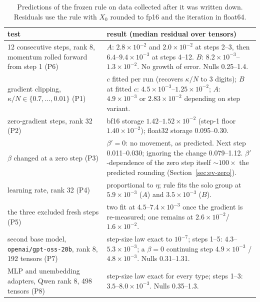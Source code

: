 \documentclass[11pt]{article}
\begin{document}
\begin{table}[ht]\centering\small
\begin{tabular}{p{4.6cm}p{10.6cm}}\toprule
test & result (median residual over tensors)\\\midrule
12 consecutive steps, rank 8, momentum rolled forward from step 1 (P6) &
$A$: $2.8\times10^{-2}$ and $2.0\times10^{-2}$ at steps 2--3, then $6.4$--$9.4\times10^{-3}$ at steps
4--12. $B$: $8.2\times10^{-3}$--$1.3\times10^{-2}$. No growth of error. Nulls 0.25--1.4.\\
gradient clipping, $\kappa/N\in\{0.7,\dots,0.01\}$ (P1) & $c$ fitted per run (recovers $\kappa/N$ to 3
digits); $B$ at fitted $c$: $4.5\times10^{-3}$--$1.25\times10^{-2}$; $A$: $4.9\times10^{-3}$ or
$2.83\times10^{-2}$ depending on step variant.\\
zero-gradient steps, rank 32 (P2) & bf16 storage $1.42$--$1.52\times10^{-2}$ (step-1 floor
$1.40\times10^{-2}$); float32 storage 0.095--0.30.\\
$\beta$ changed at a zero step (P3) & $\beta'=0$: no movement, as predicted. Next step
0.011--0.030; ignoring the change 0.079--1.12. $\beta'$-dependence of the zero step itself $\sim100\times$
the predicted rounding (Section~\ref{sec:ev-zero}).\\
learning rate, rank 32 (P4) & proportional to $\eta$; rule fits the solo group at $5.9\times10^{-3}$
($A$) and $3.5\times10^{-3}$ ($B$).\\
the three excluded fresh steps (P5) & two fit at $4.5$--$7.4\times10^{-3}$ once the gradient is
re-measured; one remains at $2.6\times10^{-2}$/$1.6\times10^{-2}$.\\
second base model, \texttt{openai/gpt-oss-20b}, rank 8, 192 tensors (P7) & step-size law exact to
$10^{-7}$; steps 1--5: $4.3$--$5.3\times10^{-3}$; a $\beta=0$ continuing step $4.9\times10^{-3}$ /
$4.8\times10^{-3}$. Nulls 0.31--1.31.\\
MLP and unembedding adapters, Qwen rank 8, 498 tensors (P8) & step-size law exact for every type;
steps 1--3: $3.5$--$8.0\times10^{-3}$. Nulls 0.35--1.3.\\\bottomrule
\end{tabular}
\caption{Predictions of the frozen rule on data collected after it was written down. Residuals use
the rule with $X_0$ rounded to fp16 and the iteration in float64.}\label{tab:oos}
\end{table}
\end{document}
